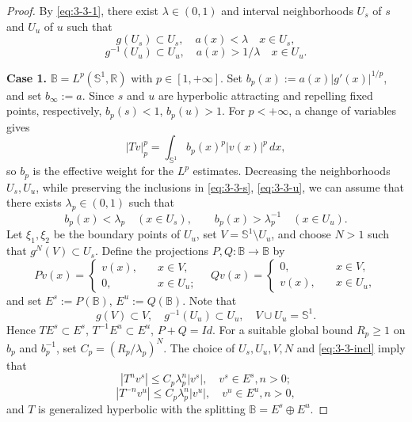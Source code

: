 \documentclass[12pt]{article}
\newcommand{\Bb}{\mathbb{B}}
\newcommand{\Rr}{\mathbb{R}}
\theoremstyle{definition}
\begin{document}
\begin{proof}
    By \eqref{eq:3-3-1}, there exist $\lambda \in (0, 1)$ and interval neighborhoods $U_s$ of $s$ and $U_u$ of $u$ such that
\begin{equation}\label{eq:3-3-s}
    g(U_s) \subset U_s, \quad a(x) < \lambda \quad x \in U_s,
\end{equation}    
\begin{equation}\label{eq:3-3-u}
    g^{-1}(U_u) \subset U_u, \quad a(x) > 1/\lambda \quad x \in U_u.
\end{equation}   

\textbf{Case 1.} $\Bb = L^p(\mathbb{S}^1, \Rr)$ with $p \in [1, +\infty]$.
Set $b_p(x):=a(x)|g'(x)|^{1/p}$, and set $b_\infty:=a$. Since $s$ and $u$ are hyperbolic attracting and repelling fixed points, respectively,
$b_p(s)<1$, $b_p(u)>1$.
For $p<+\infty$, a change of variables gives
$$
|Tv|_p^p=\int_{\mathbb S^1} b_p(x)^p|v(x)|^p\,dx,
$$
so $b_p$ is the effective weight for the $L^p$ estimates.
Decreasing the neighborhoods $U_s,U_u$, while preserving the inclusions in \eqref{eq:3-3-s}, \eqref{eq:3-3-u}, we can assume that there exists $\lambda_p\in(0,1)$ such that
$$
b_p(x)<\lambda_p\quad(x\in U_s),
\qquad
b_p(x)>\lambda_p^{-1}\quad(x\in U_u).
$$
Let $\xi_1,\xi_2$ be the boundary points of $U_u$, set $V=\mathbb S^1\setminus U_u$, and choose $N>1$ such that $g^N(V)\subset U_s$.
Define the projections $P, Q: \Bb \to \Bb$ by
$$
Pv(x) = 
\begin{cases}
    v(x), & \quad x \in V, \\
    0, & \quad x \in U_u;
\end{cases}
\quad 
Qv(x) = 
\begin{cases}
    0, & \quad x \in V, \\
    v(x), & \quad x \in U_u,
\end{cases}
$$
and set $E^s := P(\Bb)$, $E^u := Q(\Bb)$.
Note that 
\begin{equation}\label{eq:3-3-incl}
g(V) \subset V, \quad g^{-1}(U_u) \subset U_u, \quad V \cup U_u = \mathbb{S}^1.
\end{equation}
Hence 
$TE^s \subset E^s$, $T^{-1}E^u \subset E^u$, $P+Q = Id$.
For a suitable global bound $R_p\geq1$ on $b_p$ and $b_p^{-1}$, set
$C_p=(R_p/\lambda_p)^N$.
The choice of $U_s,U_u,V,N$ and \eqref{eq:3-3-incl} imply that
\begin{equation}\label{eq:Pushs}
|T^n v^s| \leq C_p\lambda_p^{n}|v^s|, \quad v^s \in E^s, n > 0;    
\end{equation}
\begin{equation}\label{eq:Pushu}
|T^{-n} v^u| \leq C_p\lambda_p^{n}|v^u|, \quad v^u \in E^u, n > 0,
\end{equation}
and $T$ is generalized hyperbolic with the splitting $\Bb = E^s \oplus E^u$.


\end{proof}
\end{document}
